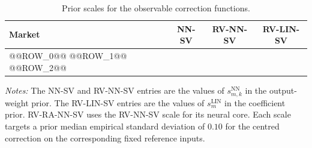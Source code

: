 \begin{table}[htbp]
\centering
\caption{Prior scales for the observable correction functions.}
\label{tab:oa-prior-scales}
\begin{tabular}{@{}lccc@{}}
\toprule
Market & NN-SV & RV-NN-SV & RV-LIN-SV \\
\midrule
@@ROW_0@@
@@ROW_1@@
@@ROW_2@@
\bottomrule
\end{tabular}
\par\medskip
\begin{minipage}{0.90\textwidth}
\footnotesize
\textit{Notes:} The NN-SV and RV-NN-SV entries are the values of $s_{m,k}^{\mathrm{NN}}$ in the output-weight prior. The RV-LIN-SV entries are the values of $s_m^{\mathrm{LIN}}$ in the coefficient prior. RV-RA-NN-SV uses the RV-NN-SV scale for its neural core. Each scale targets a prior median empirical standard deviation of $0.10$ for the centred correction on the corresponding fixed reference inputs.
\end{minipage}
\end{table}
